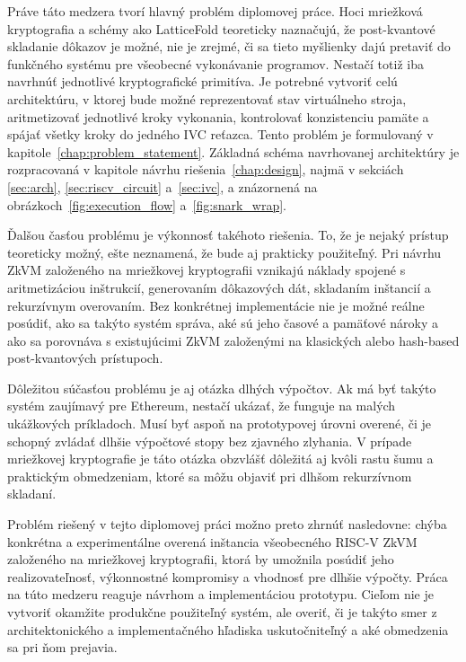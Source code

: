 Práve táto medzera tvorí hlavný problém diplomovej práce. Hoci mriežková
kryptografia a schémy ako LatticeFold teoreticky naznačujú, že post-kvantové
skladanie dôkazov je možné, nie je zrejmé, či sa tieto myšlienky dajú pretaviť
do funkčného systému pre všeobecné vykonávanie programov. Nestačí totiž iba
navrhnúť jednotlivé kryptografické primitíva. Je potrebné vytvoriť celú
architektúru, v ktorej bude možné reprezentovať stav virtuálneho stroja,
aritmetizovať jednotlivé kroky vykonania, kontrolovať konzistenciu pamäte a
spájať všetky kroky do jedného IVC reťazca. Tento problém je formulovaný v
kapitole~\ref{chap:problem_statement}. Základná schéma navrhovanej architektúry
je rozpracovaná v kapitole návrhu riešenia~\ref{chap:design}, najmä v sekciách
\ref{sec:arch}, \ref{sec:riscv_circuit} a~\ref{sec:ivc}, a znázornená na
obrázkoch~\ref{fig:execution_flow} a~\ref{fig:snark_wrap}.

Ďalšou časťou problému je výkonnosť takéhoto riešenia. To, že je nejaký prístup
teoreticky možný, ešte neznamená, že bude aj prakticky použiteľný. Pri návrhu
ZkVM založeného na mriežkovej kryptografii vznikajú náklady spojené s
aritmetizáciou inštrukcií, generovaním dôkazových dát, skladaním inštancií a
rekurzívnym overovaním. Bez konkrétnej implementácie nie je možné reálne
posúdiť, ako sa takýto systém správa, aké sú jeho časové a pamäťové nároky a
ako sa porovnáva s existujúcimi ZkVM založenými na klasických alebo hash-based
post-kvantových prístupoch.

Dôležitou súčasťou problému je aj otázka dlhých výpočtov. Ak má byť takýto
systém zaujímavý pre Ethereum, nestačí ukázať, že funguje na malých ukážkových
príkladoch. Musí byť aspoň na prototypovej úrovni overené, či je schopný zvládať
dlhšie výpočtové stopy bez zjavného zlyhania. V prípade mriežkovej kryptografie
je táto otázka obzvlášť dôležitá aj kvôli rastu šumu a praktickým obmedzeniam,
ktoré sa môžu objaviť pri dlhšom rekurzívnom skladaní.

Problém riešený v tejto diplomovej práci možno preto zhrnúť nasledovne: chýba
konkrétna a experimentálne overená inštancia všeobecného RISC-V ZkVM založeného
na mriežkovej kryptografii, ktorá by umožnila posúdiť jeho realizovateľnosť,
výkonnostné kompromisy a vhodnosť pre dlhšie výpočty. Práca na túto medzeru
reaguje návrhom a implementáciou prototypu. Cieľom nie je vytvoriť okamžite
produkčne použiteľný systém, ale overiť, či je takýto smer z architektonického
a implementačného hľadiska uskutočniteľný a aké obmedzenia sa pri ňom prejavia.

